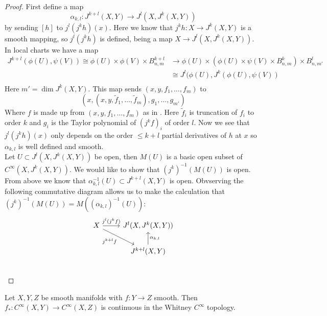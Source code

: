 \documentclass[12pt]{article}
\begin{document}
\begin{proof}
    First define a map 
    $$
    \alpha_{k, l}: J^{k+l} (X, Y) \to J^l(X, J^k(X, Y))
    $$
    by sending $[h]$ to $j^l(j^k h) (x)$. Here we know that $j^k h: X \to J^k(X, Y)$ is a smooth mapping, so $j^l (j^k h)$ is defined, being a map $X \to J^l(X, J^k(X, Y))$. In local charts we have a map
    \begin{align*}
        J^{k+l}(\phi(U), \psi(V)) \cong \phi(U) \times \phi(V) \times B_{n, m}^{k+l} & \to \phi(U) \times \left( \phi(U) \times \psi (V) \times B_{n, m}^k \right) \times B_{n, m'}^l \\
        & \cong J^l(\phi(U), J^k(\phi(U), \psi(V)) \\
    \end{align*}
    Here $m' = \dim J^k(X, Y)$. This map sends $(x, y, f_1, \dots, f_m)$ to 
    $$
    (x, (x, y, \tilde{f}_1, \dots, \tilde{f}_m), g_1, \dots, g_{m'})
    $$
    Where $f$ is made up from $(x, y, f_1, \dots, f_m)$ as in . Here $\tilde{f}_i$ is truncation of $f_i$ to order $k$ and $g_i$ is the Taylor polynomial of $(j^k f)_i$ of order $l$. Now we see that $j^l (j^k h) (x)$ only depends on the order $\leq k+l$ partial derivatives of $h$ at $x$ so $\alpha_{k, l}$ is well defined and smooth. \\
    
    Let $U\subset J^l(X, J^k(X, Y))$ be open, then $M(U)$ is a basic open subset of $C^\infty(X, J^k(X, Y))$. We would like to show that $(j^k)^{-1}(M(U))$ is open. From above we know that $\alpha_{k, l}^{-1}(U) \subset J^{k+l}(X, Y)$ is open. Obvserving the following commutative diagram allows us to make the calculation that $(j^k)^{-1} (M(U)) = M((\alpha_{k, l})^{-1} (U))$: 
    $$
    \begin{tikzcd}
        X \arrow[dr, "j^{k+l} f"'] \arrow[r, "j^l (j^k f)"] & J^l(X, J^k(X, Y)) \\ 
        & J^{k+l}(X, Y) \arrow[u, "\alpha_{k, l}"'] \\ 
    \end{tikzcd}
    $$
\end{proof}

\begin{proposition}
    Let $X, Y, Z$ be smooth manifolds with $f: Y \to Z$ smooth. Then $f_*: C^\infty(X, Y) \to C^\infty(X, Z)$ is continuous in the Whitney $C^\infty$ topology. 
\end{proposition}
\end{document}
